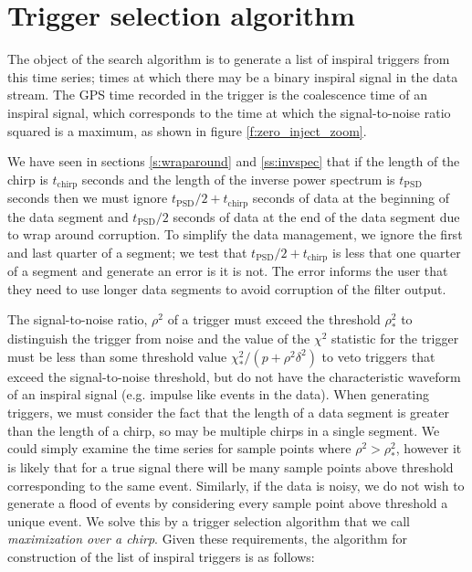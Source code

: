\section{Trigger selection algorithm}
\label{s:maxoverchirp}

The object of the search algorithm is to generate a list of inspiral triggers
from this time series; times at which there may be a binary inspiral signal in
the data stream. The GPS time recorded in the trigger is the coalescence time of
an inspiral signal, which corresponds to the time at which the signal-to-noise
ratio squared is a maximum, as shown in figure \ref{f:zero_inject_zoom}.

We have seen in sections \ref{s:wraparound} and \ref{ss:invspec} that if the
length of the chirp is $t_\mathrm{chirp}$ seconds and the length of the
inverse power spectrum is $t_\mathrm{PSD}$ seconds then we must ignore
$t_\mathrm{PSD}/2 + t_\mathrm{chirp}$ seconds of data at the beginning of the
data segment and $t_\mathrm{PSD}/2$ seconds of data at the end of the data
segment due to wrap around corruption. To simplify the data management, we
ignore the first and last quarter of a segment; we test that $t_\mathrm{PSD}/2
+ t_\mathrm{chirp}$ is less that one quarter of a segment and generate an
error is it is not. The error informs the user that they need to use longer
data segments to avoid corruption of the filter output.

The signal-to-noise ratio, $\rho^2$ of a trigger must exceed the threshold
$\rho^2_\ast$ to distinguish the trigger from noise and the value of the
$\chi^2$ statistic for the trigger must be less than some threshold value
$\chi^2_\ast/(p+\rho^2\delta^2)$ to veto triggers that exceed the
signal-to-noise threshold, but do not have the characteristic waveform of an
inspiral signal (e.g. impulse like events in the data).   When generating
triggers, we must consider the fact that the length of a data segment is
greater than the length of a chirp, so may be multiple chirps in a single
segment.  We could simply examine the time series for sample points where
$\rho^2 > \rho^2_\ast$, however it is likely that for a true signal there will
be many sample points above threshold corresponding to the same event.
Similarly, if the data is noisy, we do not wish to generate a flood of events
by considering every sample point above threshold a unique event. We solve
this by a trigger selection algorithm that we call \emph{maximization over a
chirp}.  Given these requirements, the algorithm for construction of the list
of inspiral triggers is as follows:

